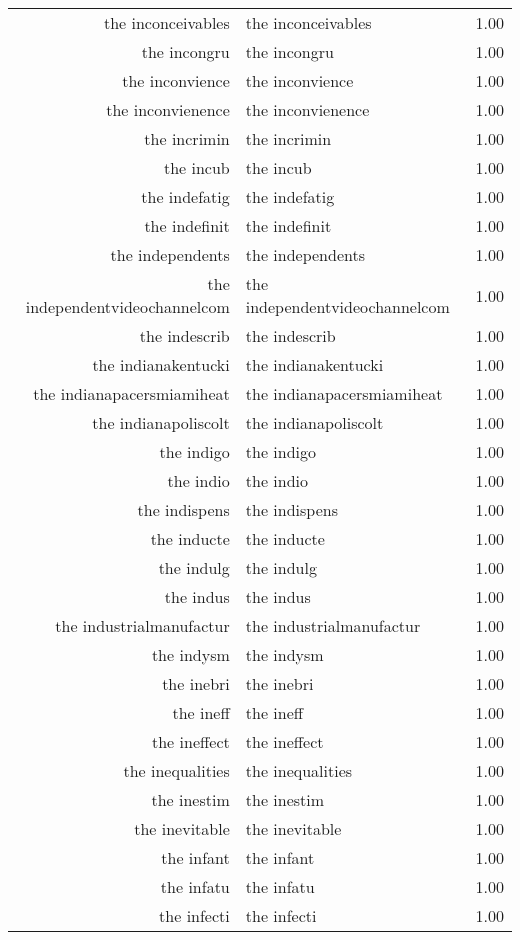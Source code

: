 \begin{table}[ht]
\begin{tabular}{rlr}
  the inconceivables & the inconceivables & 1.00 \\ 
  the incongru & the incongru & 1.00 \\ 
  the inconvience & the inconvience & 1.00 \\ 
  the inconvienence & the inconvienence & 1.00 \\ 
  the incrimin & the incrimin & 1.00 \\ 
  the incub & the incub & 1.00 \\ 
  the indefatig & the indefatig & 1.00 \\ 
  the indefinit & the indefinit & 1.00 \\ 
  the independents & the independents & 1.00 \\ 
  the independentvideochannelcom & the independentvideochannelcom & 1.00 \\ 
  the indescrib & the indescrib & 1.00 \\ 
  the indianakentucki & the indianakentucki & 1.00 \\ 
  the indianapacersmiamiheat & the indianapacersmiamiheat & 1.00 \\ 
  the indianapoliscolt & the indianapoliscolt & 1.00 \\ 
  the indigo & the indigo & 1.00 \\ 
  the indio & the indio & 1.00 \\ 
  the indispens & the indispens & 1.00 \\ 
  the inducte & the inducte & 1.00 \\ 
  the indulg & the indulg & 1.00 \\ 
  the indus & the indus & 1.00 \\ 
  the industrialmanufactur & the industrialmanufactur & 1.00 \\ 
  the indysm & the indysm & 1.00 \\ 
  the inebri & the inebri & 1.00 \\ 
  the ineff & the ineff & 1.00 \\ 
  the ineffect & the ineffect & 1.00 \\ 
  the inequalities & the inequalities & 1.00 \\ 
  the inestim & the inestim & 1.00 \\ 
  the inevitable & the inevitable & 1.00 \\ 
  the infant & the infant & 1.00 \\ 
  the infatu & the infatu & 1.00 \\ 
  the infecti & the infecti & 1.00 \\ 

\end{tabular}
\end{table}
